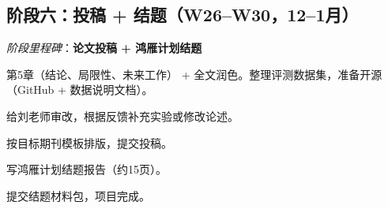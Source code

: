 \documentclass[a4paper, 11pt]{ctexart}
\begin{document}
\subsection{阶段六：投稿 + 结题（W26--W30，12--1月）}

\noindent\textit{阶段里程碑}：{\color{tsinghua}\textbf{论文投稿 + 鸿雁计划结题}}

\begin{description}[style=nextline, leftmargin=1.2cm, labelwidth=1cm, font=\bfseries\color{tsinghua}]
\item[W26] 第5章（结论、局限性、未来工作） + 全文润色。整理评测数据集，准备开源（GitHub + 数据说明文档）。
\item[W27] 给刘老师审改，根据反馈补充实验或修改论述。
\item[W28] 按目标期刊模板排版，提交投稿。
\item[W29] 写鸿雁计划结题报告（约15页）。
\item[W30] 提交结题材料包，项目完成。
\end{description}
\end{document}

